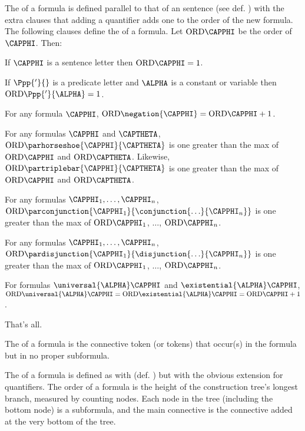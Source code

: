 \begin{majorILnc}{}
The  of a formula is defined parallel to that of an \GSL{}
sentence (see def. ) with the extra clauses that adding a quantifier adds one to the order of the new formula.
The following clauses define the  of a formula. Let $\ORD{\CAPPHI}$ be the order of $\CAPPHI$. Then: 
\begin{cenumerate}
\item If $\CAPPHI$ is a sentence letter then $\ORD{\CAPPHI}=1$.
\item If $\Ppp{'}{}$ is a predicate letter and $\ALPHA$ is a constant or variable then $\ORD{\Ppp{'}{\ALPHA}}=1$.
\item For any formula $\CAPPHI$, $\ORD{\negation{\CAPPHI}}=\ORD{\CAPPHI}+1$.
\item For any formulas $\CAPPHI$ and $\CAPTHETA$, $\ORD{\parhorseshoe{\CAPPHI}{\CAPTHETA}}$ is one greater than the max of $\ORD{\CAPPHI}$ and $\ORD{\CAPTHETA}$. Likewise, $\ORD{\partriplebar{\CAPPHI}{\CAPTHETA}}$ is one greater than the max of $\ORD{\CAPPHI}$ and $\ORD{\CAPTHETA}$.
\item For any formulas $\CAPPHI_1,\ldots,\CAPPHI_\integer{n}$, $\ORD{\parconjunction{\CAPPHI_1}{\conjunction{\ldots}{\CAPPHI_\integer{n}}}}$ is one greater than the max of $\ORD{\CAPPHI_1}$, $\ldots$, $\ORD{\CAPPHI_\integer{n}}$.
\item For any formulas $\CAPPHI_1,\ldots,\CAPPHI_\integer{n}$, $\ORD{\pardisjunction{\CAPPHI_1}{\disjunction{\ldots}{\CAPPHI_\integer{n}}}}$ is one greater than the max of $\ORD{\CAPPHI_1}$, $\ldots$, $\ORD{\CAPPHI_\integer{n}}$. 
\item For formulas $\universal{\ALPHA}\CAPPHI$ and $\existential{\ALPHA}\CAPPHI$, $\ORD{\universal{\ALPHA}\CAPPHI}=\ORD{\existential{\ALPHA}\CAPPHI}=\ORD{\CAPPHI}+1$.
\item That's all.
\end{cenumerate}
\end{majorILnc}
\begin{majorILnc}{}
The  of a formula is the connective token (or tokens) that occur(s) in the formula but in no proper subformula.
\end{majorILnc}
\begin{majorILnc}{}
The  of a formula is defined as with \GSL{} (def. ) but with the obvious extension for quantifiers. 
The order of a formula is the height of the construction tree's longest branch, measured by counting nodes.  Each node in the tree (including the bottom node) is a subformula, and the main connective is the connective added at the very bottom of the tree. 
\end{majorILnc}
